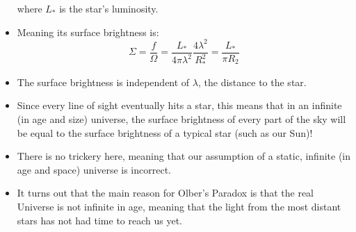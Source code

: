 \documentclass[11pt]{article}
\begin{document}
\begin{itemize}
  where $L_\ast$ is the star's luminosity.
  \item Meaning its surface brightness is:
  \begin{equation}
  \Sigma = \frac{f}{\Omega}=\frac{L_\ast}{4\pi \lambda^2}\frac{4\lambda^2}{R_\ast^2} = \frac{L_\ast}{\pi R_2}
  \end{equation}
  \item The surface brightness is independent of $\lambda$, the distance to the star.
  \item Since every line of sight eventually hits a star, this means that in an infinite (in age and size) universe, the surface brightness of every part of the sky will be equal to the surface brightness of a typical star (such as our Sun)!
  \item There is no trickery here, meaning that our assumption of a static, infinite (in age and space) universe is incorrect.
  \item It turns out that the main reason for Olber's Paradox is that the real Universe is not infinite in age, meaning that the light from the most distant stars has not had time to reach us yet.
\end{itemize}
\end{document}
